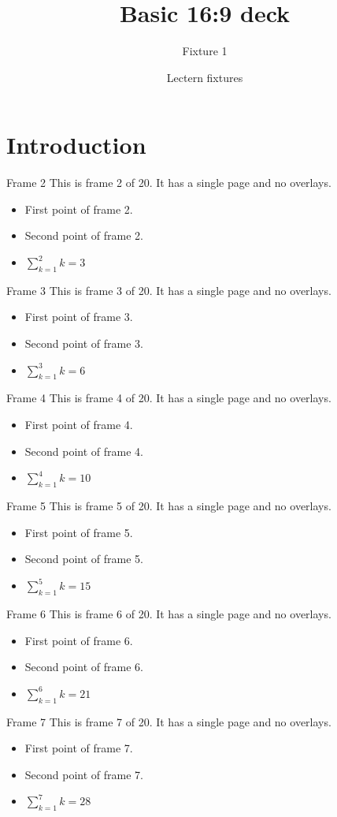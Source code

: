 \documentclass[aspectratio=169]{beamer}
\title{Basic 16:9 deck}
\subtitle{Fixture 1}
\author{Lectern fixtures}
\date{}
\begin{document}
\begin{frame}
  \titlepage
\end{frame}
\section{Introduction}
\begin{frame}{Frame 2}
  This is frame 2 of 20. It has a single page and no overlays.
  \begin{itemize}
    \item First point of frame 2.
    \item Second point of frame 2.
    \item $\sum_{k=1}^{2} k = 3$
  \end{itemize}
\end{frame}
\begin{frame}{Frame 3}
  This is frame 3 of 20. It has a single page and no overlays.
  \begin{itemize}
    \item First point of frame 3.
    \item Second point of frame 3.
    \item $\sum_{k=1}^{3} k = 6$
  \end{itemize}
\end{frame}
\begin{frame}{Frame 4}
  This is frame 4 of 20. It has a single page and no overlays.
  \begin{itemize}
    \item First point of frame 4.
    \item Second point of frame 4.
    \item $\sum_{k=1}^{4} k = 10$
  \end{itemize}
\end{frame}
\begin{frame}{Frame 5}
  This is frame 5 of 20. It has a single page and no overlays.
  \begin{itemize}
    \item First point of frame 5.
    \item Second point of frame 5.
    \item $\sum_{k=1}^{5} k = 15$
  \end{itemize}
\end{frame}
\begin{frame}{Frame 6}
  This is frame 6 of 20. It has a single page and no overlays.
  \begin{itemize}
    \item First point of frame 6.
    \item Second point of frame 6.
    \item $\sum_{k=1}^{6} k = 21$
  \end{itemize}
\end{frame}
\begin{frame}{Frame 7}
  This is frame 7 of 20. It has a single page and no overlays.
  \begin{itemize}
    \item First point of frame 7.
    \item Second point of frame 7.
    \item $\sum_{k=1}^{7} k = 28$
  \end{itemize}
\end{frame}
\end{document}
